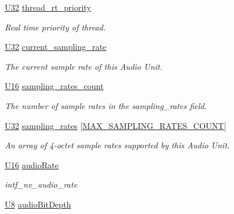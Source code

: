 \begin{DoxyCompactItemize}
\hyperlink{openavb__types__base__pub_8h_a696390429f2f3b644bde8d0322a24124}{U32} \hyperlink{structopenavb__tl__data__cfg_a55a9e2a7773c0ac79fecc40b5623a9b8}{thread\+\_\+rt\+\_\+priority}
\begin{DoxyCompactList}\small\item\em Real time priority of thread. \end{DoxyCompactList}\item 
\hyperlink{openavb__types__base__pub_8h_a696390429f2f3b644bde8d0322a24124}{U32} \hyperlink{structopenavb__tl__data__cfg_aa2a20a90661f499e91e4a4eb8aea4666}{current\+\_\+sampling\+\_\+rate}
\begin{DoxyCompactList}\small\item\em The current sample rate of this Audio Unit. \end{DoxyCompactList}\item 
\hyperlink{openavb__types__base__pub_8h_a0a0a322d5fa4a546d293a77ba8b4a71f}{U16} \hyperlink{structopenavb__tl__data__cfg_a75b9a3bf65c881bc71b05d983793aa62}{sampling\+\_\+rates\+\_\+count}
\begin{DoxyCompactList}\small\item\em The number of sample rates in the sampling\+\_\+rates field. \end{DoxyCompactList}\item 
\hyperlink{openavb__types__base__pub_8h_a696390429f2f3b644bde8d0322a24124}{U32} \hyperlink{structopenavb__tl__data__cfg_a4d629576141d6cb141a196f015fcd6ad}{sampling\+\_\+rates} \mbox{[}\hyperlink{openavb__avdecc__read__ini__pub_8h_abc74489af2084c5a3eb559c282fd16b8}{M\+A\+X\+\_\+\+S\+A\+M\+P\+L\+I\+N\+G\+\_\+\+R\+A\+T\+E\+S\+\_\+\+C\+O\+U\+NT}\mbox{]}
\begin{DoxyCompactList}\small\item\em An array of 4-\/octet sample rates supported by this Audio Unit. \end{DoxyCompactList}\item 
\hyperlink{openavb__types__base__pub_8h_a0a0a322d5fa4a546d293a77ba8b4a71f}{U16} \hyperlink{structopenavb__tl__data__cfg_a011c2e9be501a618cccfc772e016a5c7}{audio\+Rate}
\begin{DoxyCompactList}\small\item\em intf\+\_\+nv\+\_\+audio\+\_\+rate \end{DoxyCompactList}\item 
\hyperlink{openavb__types__base__pub_8h_aa63ef7b996d5487ce35a5a66601f3e73}{U8} \hyperlink{structopenavb__tl__data__cfg_a376a2e143cb7e9950aac9310930a021d}{audio\+Bit\+Depth}

\end{DoxyCompactItemize}
